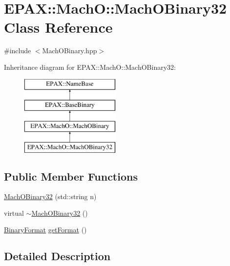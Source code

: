 \hypertarget{class_e_p_a_x_1_1_mach_o_1_1_mach_o_binary32}{\section{\-E\-P\-A\-X\-:\-:\-Mach\-O\-:\-:\-Mach\-O\-Binary32 \-Class \-Reference}
\label{class_e_p_a_x_1_1_mach_o_1_1_mach_o_binary32}
}


{\ttfamily \#include $<$\-Mach\-O\-Binary.\-hpp$>$}

\-Inheritance diagram for \-E\-P\-A\-X\-:\-:\-Mach\-O\-:\-:\-Mach\-O\-Binary32\-:\begin{figure}[H]
\begin{center}
\leavevmode
\includegraphics[height=4.000000cm]{class_e_p_a_x_1_1_mach_o_1_1_mach_o_binary32}
\end{center}
\end{figure}
\subsection*{\-Public \-Member \-Functions}
\begin{DoxyCompactItemize}
\item 
\hyperlink{class_e_p_a_x_1_1_mach_o_1_1_mach_o_binary32_afa9f9ebb9a5767c61ed434895bb54c6d}{\-Mach\-O\-Binary32} (std\-::string n)
\item 
virtual \hyperlink{class_e_p_a_x_1_1_mach_o_1_1_mach_o_binary32_abf8ad43c31531cfb3b71e5acda25b3cb}{$\sim$\-Mach\-O\-Binary32} ()
\item 
\hyperlink{namespace_e_p_a_x_a4be639c006ef14def4708b37ee6dd67d}{\-Binary\-Format} \hyperlink{class_e_p_a_x_1_1_mach_o_1_1_mach_o_binary32_a37eab3a09ee0f670f2633a56c890100e}{get\-Format} ()
\end{DoxyCompactItemize}


\subsection{\-Detailed \-Description}


